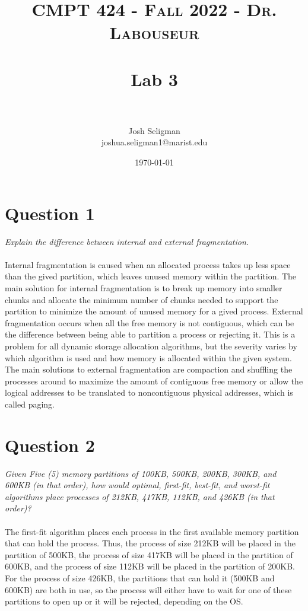 \documentclass[letterpaper, 10pt,DIV=13]{scrartcl}
\title{	
   \normalfont \normalsize 
   \textsc{CMPT 424 - Fall 2022 - Dr. Labouseur} \\[10pt] %
   \horrule{0.5pt} \\[0.25cm] 	%
   \huge Lab 3  \\     	    %
   \horrule{0.5pt} \\[0.25cm] 	%
}
\author{Josh Seligman \\ \normalsize joshua.seligman1@marist.edu}
\date{\normalsize\today} 	%
\numberwithin{equation}{section} %
\numberwithin{figure}{section} %
\numberwithin{table}{section} %
\begin{document}
\maketitle %

\section{Question 1}
\textit{Explain the difference between internal and external fragmentation.} \\ \\
Internal fragmentation is caused when an allocated process takes up less space than the gived partition, which leaves unused memory within the partition. The main solution for internal fragmentation is to break up memory into smaller chunks and allocate the minimum number of chunks needed to support the partition to minimize the amount of unused memory for a gived process. External fragmentation occurs when all the free memory is not contiguous, which can be the difference between being able to partition a process or rejecting it. This is a problem for all dynamic storage allocation algorithms, but the severity varies by which algorithm is used and how memory is allocated within the given system. The main solutions to external fragmentation are compaction and shuffling the processes around to maximize the amount of contiguous free memory or allow the logical addresses to be translated to noncontiguous physical addresses, which is called paging.

\section{Question 2}
\textit{Given Five (5) memory partitions of 100KB, 500KB, 200KB, 300KB, and 600KB (in that order), how would optimal, first-fit, best-fit, and worst-fit algorithms place processes of 212KB, 417KB, 112KB, and 426KB (in that order)?} \\ \\
The first-fit algorithm places each process in the first available memory partition that can hold the process. Thus, the process of size 212KB will be placed in the partition of 500KB, the process of size 417KB will be placed in the partition of 600KB, and the process of size 112KB will be placed in the partition of 200KB. For the process of size 426KB, the partitions that can hold it (500KB and 600KB) are both in use, so the process will either have to wait for one of these partitions to open up or it will be rejected, depending on the OS.
\end{document}
